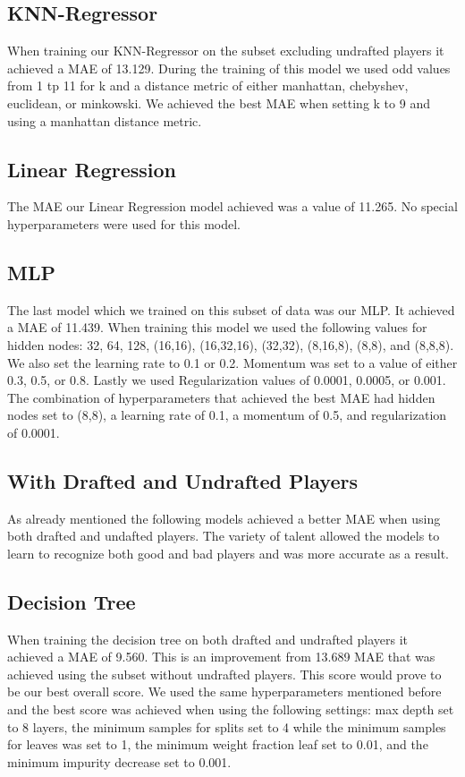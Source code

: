 \documentclass{article}
\begin{document}
\subsection{KNN-Regressor}

When training our KNN-Regressor on the subset excluding undrafted players it achieved a MAE of 13.129.
During the training of this model we used odd values from 1 tp 11 for k and a distance metric of 
either manhattan, chebyshev, euclidean, or minkowski.
We achieved the best MAE when setting k to 9 and using a manhattan distance metric.

\subsection{Linear Regression}

The MAE our Linear Regression model achieved was a value of 11.265.
No special hyperparameters were used for this model.

\subsection{MLP}

The last model which we trained on this subset of data was our MLP. It achieved a MAE of 11.439.
When training this model we used the following values for hidden nodes: 32, 64, 128, (16,16), (16,32,16), (32,32), (8,16,8), (8,8), and (8,8,8).
We also set the learning rate to 0.1 or 0.2. Momentum was set to a value of either 0.3, 0.5, or 0.8. 
Lastly we used Regularization values of 0.0001, 0.0005, or 0.001.
The combination of hyperparameters that achieved the best MAE had hidden nodes set to (8,8), a learning rate of 0.1,
a momentum of 0.5, and regularization of 0.0001.

\subsection{With Drafted and Undrafted Players}

As already mentioned the following models achieved a better MAE when using both drafted and undafted players. 
The variety of talent allowed the models to learn to recognize both good and bad players and was more accurate as a result.

\subsection{Decision Tree}

When training the decision tree on both drafted and undrafted players it achieved a MAE of 9.560. 
This is an improvement from 13.689 MAE that was achieved using the subset without undrafted players.
This score would prove to be our best overall score. We used the same hyperparameters mentioned before and the
best score was achieved when using the following settings: max depth set to 8 layers, 
the minimum samples for splits set to 4 while the minimum samples for leaves was set to 1, the minimum weight fraction leaf 
set to 0.01, and the minimum impurity decrease set to 0.001.
\end{document}
